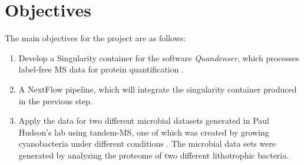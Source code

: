 \section{Objectives}

The main objectives for the project are as follows:
\begin{enumerate}
\item Develop a Singularity container for the software \textit{Quandenser}, which processes label-free MS data for protein quantification \cite{quandenser}.
\item A NextFlow pipeline, which will integrate the singularity container produced in the previous step.
\item Apply the data for two different microbial datasets generated in Paul Hudson’s lab using tandem-MS, one of which was created by growing cyanobacteria under different conditions \cite{michael}. The microbial data sets were generated by analyzing the proteome of two different lithotrophic bacteria.
\end{enumerate}

